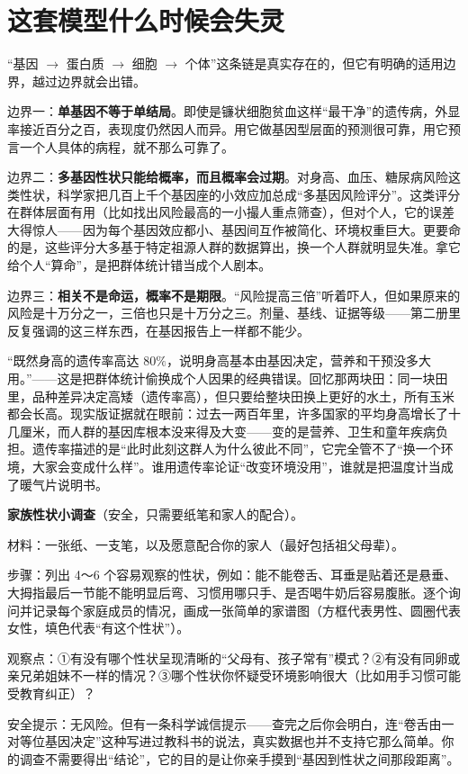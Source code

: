 \section{这套模型什么时候会失灵}

“基因 $\rightarrow$ 蛋白质 $\rightarrow$ 细胞 $\rightarrow$ 个体”这条链是真实存在的，但它有明确的适用边界，越过边界就会出错。

边界一：\textbf{单基因不等于单结局}。即使是镰状细胞贫血这样“最干净”的遗传病，外显率接近百分之百，表现度仍然因人而异。用它做基因型层面的预测很可靠，用它预言一个人具体的病程，就不那么可靠了。

边界二：\textbf{多基因性状只能给概率，而且概率会过期}。对身高、血压、糖尿病风险这类性状，科学家把几百上千个基因座的小效应加总成“多基因风险评分”。这类评分在群体层面有用（比如找出风险最高的一小撮人重点筛查），但对个人，它的误差大得惊人——因为每个基因效应都小、基因间互作被简化、环境权重巨大。更要命的是，这些评分大多基于特定祖源人群的数据算出，换一个人群就明显失准。拿它给个人“算命”，是把群体统计错当成个人剧本。

边界三：\textbf{相关不是命运，概率不是期限}。“风险提高三倍”听着吓人，但如果原来的风险是十万分之一，三倍也只是十万分之三。剂量、基线、证据等级——第二册里反复强调的这三样东西，在基因报告上一样都不能少。

\begin{wuqu}
“既然身高的遗传率高达 $80\%$，说明身高基本由基因决定，营养和干预没多大用。”——这是把群体统计偷换成个人因果的经典错误。回忆那两块田：同一块田里，品种差异决定高矮（遗传率高），但只要给整块田换上更好的水土，所有玉米都会长高。现实版证据就在眼前：过去一两百年里，许多国家的平均身高增长了十几厘米，而人群的基因库根本没来得及大变——变的是营养、卫生和童年疾病负担。遗传率描述的是“此时此刻这群人为什么彼此不同”，它完全管不了“换一个环境，大家会变成什么样”。谁用遗传率论证“改变环境没用”，谁就是把温度计当成了暖气片说明书。
\end{wuqu}

\begin{shiyan}
\textbf{家族性状小调查}（安全，只需要纸笔和家人的配合）。

材料：一张纸、一支笔，以及愿意配合你的家人（最好包括祖父母辈）。

步骤：列出 4～6 个容易观察的性状，例如：能不能卷舌、耳垂是贴着还是悬垂、大拇指最后一节能不能明显后弯、习惯用哪只手、是否喝牛奶后容易腹胀。逐个询问并记录每个家庭成员的情况，画成一张简单的家谱图（方框代表男性、圆圈代表女性，填色代表“有这个性状”）。

观察点：①有没有哪个性状呈现清晰的“父母有、孩子常有”模式？②有没有同卵或亲兄弟姐妹不一样的情况？③哪个性状你怀疑受环境影响很大（比如用手习惯可能受教育纠正）？

安全提示：无风险。但有一条科学诚信提示——查完之后你会明白，连“卷舌由一对等位基因决定”这种写进过教科书的说法，真实数据也并不支持它那么简单。你的调查不需要得出“结论”，它的目的是让你亲手摸到“基因到性状之间那段距离”。
\end{shiyan}

